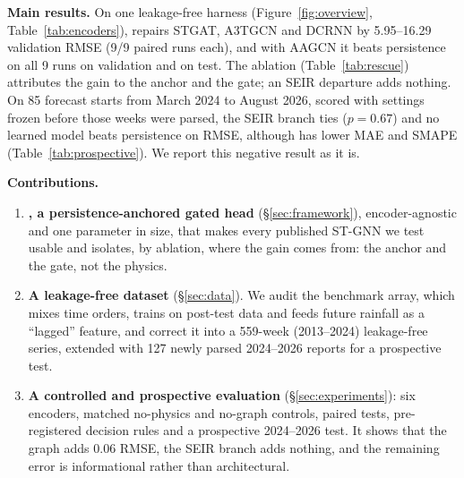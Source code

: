 \textbf{Main results.} On one leakage-free harness (Figure~\ref{fig:overview},
Table~\ref{tab:encoders}), \model{} repairs STGAT, A3TGCN and DCRNN by 5.95--16.29
validation RMSE (9/9 paired runs each), and with AAGCN it beats persistence on all
9 runs on validation and on test. The ablation (Table~\ref{tab:rescue}) attributes the
gain to the anchor and the gate; an SEIR departure adds nothing. On 85 forecast starts
from March 2024 to August 2026, scored with settings frozen before those weeks were
parsed, the SEIR branch ties \model{} ($p=0.67$) and no learned model beats persistence on
RMSE, although \model{} has lower MAE and SMAPE (Table~\ref{tab:prospective}). We report
this negative result as it is.

\noindent\textbf{Contributions.}
\begin{enumerate}\itemsep1pt
  \item \textbf{\model{}, a persistence-anchored gated head} (\S\ref{sec:framework}),
        encoder-agnostic and one parameter in size, that makes every published
        ST-GNN we test usable and isolates, by ablation, where the gain comes from:
        the anchor and the gate, not the physics.
  \item \textbf{A leakage-free dataset} (\S\ref{sec:data}). We audit the benchmark
        array, which mixes time orders, trains on post-test data and feeds future
        rainfall as a ``lagged'' feature, and correct it into a 559-week (2013--2024)
        leakage-free series, extended with 127 newly parsed 2024--2026 reports for
        a prospective test.
  \item \textbf{A controlled and prospective evaluation} (\S\ref{sec:experiments}):
        six encoders, matched no-physics and no-graph controls, paired tests,
        pre-registered decision rules and a prospective 2024--2026 test. It shows that
        the graph adds 0.06 RMSE, the SEIR branch adds nothing, and the remaining
        error is informational rather than architectural.
\end{enumerate}
